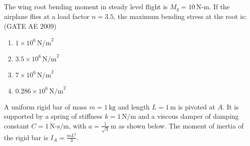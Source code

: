     \noindent The wing root bending moment in steady level flight is \( M_y = 10 \, \text{N-m} \). If the airplane flies at a load factor \( n = 3.5 \), the maximum bending stress at the root is:  \hfill (GATE AE 2009)
    \begin{multicols}{4}
        \begin{enumerate}
            \item \( 1 \times 10^6 \, \text{N/m}^2 \)
            \item \( 3.5 \times 10^6 \, \text{N/m}^2 \)
            \item \( 7 \times 10^6 \, \text{N/m}^2 \)
            \item \( 0.286 \times 10^6 \, \text{N/m}^2 \)
        \end{enumerate}
    \end{multicols}
    
    
    \item A uniform rigid bar of mass \( m = 1 \, \text{kg} \) and length \( L = 1 \, \text{m} \) is pivoted at \( A \). It is supported by a spring of stiffness \( k = 1 \, \text{N/m} \) and a viscous damper of damping constant \( C = 1 \, \text{N-s/m} \), with \( a = \frac{1}{\sqrt{3}} \, \text{m} \) as shown below. The moment of inertia of the rigid bar is \( I_A = \frac{mL^2}{3} \).
    
